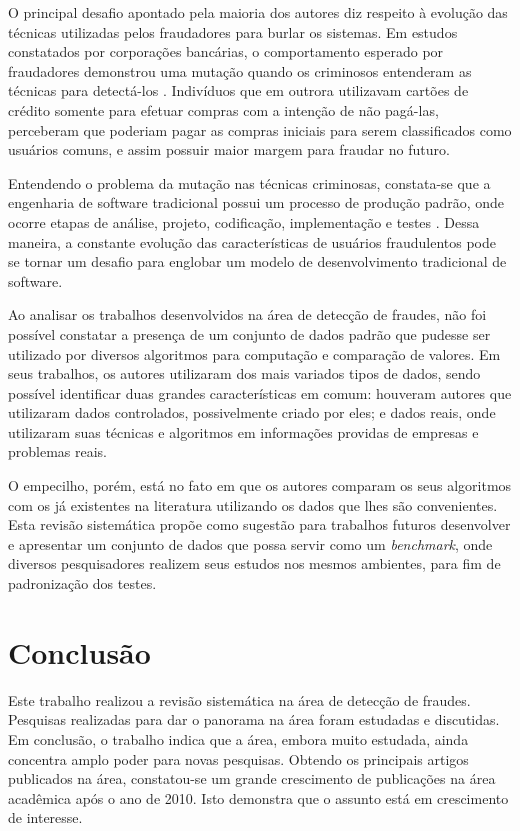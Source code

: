 \documentclass[smallextended]{svjour3}
\begin{document}
O principal desafio apontado pela maioria dos autores diz respeito à evolução das técnicas utilizadas pelos fraudadores para burlar os sistemas. Em estudos constatados por corporações bancárias, o comportamento esperado por fraudadores demonstrou uma mutação quando os criminosos entenderam as técnicas para detectá-los \citep{Bolton2002}. Indivíduos que em outrora utilizavam cartões de crédito somente para efetuar compras com a intenção de não pagá-las, perceberam que poderiam pagar as compras iniciais para serem classificados como usuários comuns, e assim possuir maior margem para fraudar no futuro.

Entendendo o problema da mutação nas técnicas criminosas, constata-se que a engenharia de software tradicional possui um processo de produção padrão, onde ocorre etapas de análise, projeto, codificação, implementação e testes \citep{sommervillesoftware}. Dessa maneira, a constante evolução das características de usuários fraudulentos pode se tornar um desafio para englobar um modelo de desenvolvimento tradicional de software. 

Ao analisar os trabalhos desenvolvidos na área de detecção de fraudes, não foi possível constatar a presença de um conjunto de dados padrão que pudesse ser utilizado por diversos algoritmos para computação e comparação de valores. Em seus trabalhos, os autores utilizaram dos mais variados tipos de dados, sendo possível identificar duas grandes características em comum: houveram autores que utilizaram dados controlados, possivelmente criado por eles; e dados reais, onde utilizaram suas técnicas e algoritmos em informações providas de empresas e problemas reais. 

O empecilho, porém, está no fato em que os autores comparam os seus algoritmos com os já existentes na literatura utilizando os dados que lhes são convenientes. Esta revisão sistemática propõe como sugestão para trabalhos futuros desenvolver e apresentar um conjunto de dados que possa servir como um \emph{benchmark}, onde diversos pesquisadores realizem seus estudos nos mesmos ambientes, para fim de padronização dos testes. 

\section{Conclusão}
\label{sec:6}

Este trabalho realizou a revisão sistemática na área de detecção de fraudes. Pesquisas realizadas para dar o panorama na área foram estudadas e discutidas. Em conclusão, o trabalho indica que a área, embora muito estudada, ainda concentra amplo poder para novas pesquisas. Obtendo os principais artigos publicados na área, constatou-se um grande crescimento de publicações na área acadêmica após o ano de 2010. Isto demonstra que o assunto está em crescimento de interesse.
\end{document}
